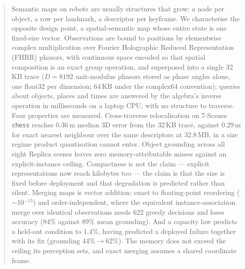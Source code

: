\documentclass[conference]{IEEEtran}
\begin{document}
\begin{abstract}
Semantic maps on robots are usually structures that grow: a node per
object, a row per landmark, a descriptor per keyframe. We characterise
the opposite design point, a spatial-semantic map whose entire state is
one fixed-size vector. Observations are bound to positions by elementwise
complex multiplication over Fourier Holographic Reduced Representation
(FHRR) phasors, with continuous space encoded so that spatial
composition is an exact group operation, and superposed into a single
32\,KB trace ($D=8192$ unit-modulus phasors stored as phase angles alone,
one float32 per dimension; 64\,KB under the complex64 convention);
queries about objects, places and times are answered by the
algebra's inverse operation in milliseconds on a laptop CPU, with no
structure to traverse. Four properties are measured. Cross-traverse
relocalisation on 7-Scenes \texttt{chess} reaches 0.36\,m median 3D error
from the 32\,KB trace, against 0.29\,m for exact nearest neighbour over
the same descriptors at 32.8\,MB, in a size regime product quantisation
cannot enter. Object grounding across all eight Replica scenes leaves
zero memory-attributable misses against an explicit-instance ceiling.
Compactness is not the claim --- explicit representations now reach
kilobytes too --- the claim is that the size is fixed before deployment
and that degradation is predicted rather than silent.
Merging maps is vector addition: exact to floating-point reordering
($\sim$10$^{-15}$) and order-independent, where the equivalent
instance-association merge over identical observations needs 622 greedy
decisions and loses accuracy (84\% against 89\% mean grounding). And a
capacity law predicts a held-out condition to 1.4\%, having predicted a
deployed failure together with its fix (grounding 44\%$\to$62\%). The
memory does not exceed the ceiling its perception sets, and exact
merging assumes a shared coordinate frame.
\end{abstract}
\end{document}
